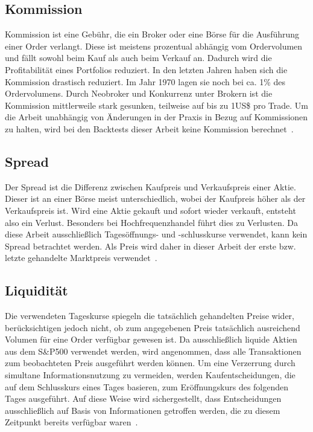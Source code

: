 \subsection*{Kommission}\label{subsec:kommission}

Kommission ist eine Gebühr, die ein Broker oder eine Börse für die Ausführung einer Order verlangt. Diese ist meistens prozentual abhängig vom Ordervolumen und fällt sowohl beim Kauf als auch beim Verkauf an. Dadurch wird die Profitabilität eines Portfolios reduziert. In den letzten Jahren haben sich die Kommission drastisch reduziert. Im Jahr 1970 lagen sie noch bei ca. 1\% des Ordervolumens. Durch Neobroker und Konkurrenz unter Brokern ist die Kommission mittlerweile stark gesunken, teilweise auf bis zu 1US\$ pro Trade. Um die Arbeit unabhängig von Änderungen in der Praxis in Bezug auf Kommissionen zu halten, wird bei den Backtests dieser Arbeit keine Kommission berechnet~\cite{jones2002century}.

\subsection*{Spread}\label{subsec:spread}

Der Spread ist die Differenz zwischen Kaufpreis und Verkaufspreis einer Aktie. Dieser ist an einer Börse meist unterschiedlich, wobei der Kaufpreis höher als der Verkaufspreis ist.
Wird eine Aktie gekauft und sofort wieder verkauft, entsteht also ein Verlust. Besonders bei Hochfrequenzhandel führt dies zu Verlusten. Da diese Arbeit ausschließlich Tagesöffnungs- und -schlusskurse verwendet, kann kein Spread betrachtet werden. Als Preis wird daher in dieser Arbeit der erste bzw. letzte gehandelte Marktpreis verwendet~\cite{jones2002century}.

\subsection*{Liquidität}\label{subsec:liquiditaet}

Die verwendeten Tageskurse spiegeln die tatsächlich gehandelten Preise wider, berücksichtigen jedoch nicht, ob zum angegebenen Preis tatsächlich ausreichend Volumen für eine Order verfügbar gewesen ist. Da ausschließlich liquide Aktien aus dem S\&P500 verwendet werden, wird angenommen, dass alle Transaktionen zum beobachteten Preis ausgeführt werden können. Um eine Verzerrung durch simultane Informationsnutzung zu vermeiden, werden Kaufentscheidungen, die auf dem Schlusskurs eines Tages basieren, zum Eröffnungskurs des folgenden Tages ausgeführt. Auf diese Weise wird sichergestellt, dass Entscheidungen ausschließlich auf Basis von Informationen getroffen werden, die zu diesem Zeitpunkt bereits verfügbar waren~\cite{loras2024slippage}.


